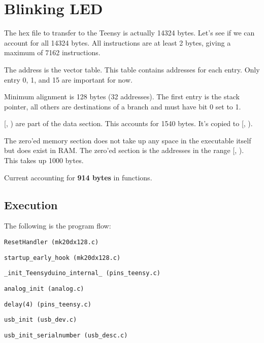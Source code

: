 \newpage
\section{Blinking LED}

The hex file to transfer to the Teensy is actually 14324 bytes.
Let's see if we can account for all 14324 bytes.
All instructions are at least 2 bytes, giving a maximum of 7162 instructions.

The address  is the vector table. This table contains
addresses for each entry. Only entry 0, 1, and 15 are important for now.

Minimum alignment is 128 bytes (32 addresses). The first entry is the stack
pointer, all others are destinations of a branch and must have bit 0 set to 1.

[, ) are part of the data
section. This accounts for 1540 bytes. It's copied to
[, ).

The zero'ed memory section does not take up any space in the executable itself
but does exist in RAM. The zero'ed section is the addresses in the range
[, ).
This takes up 1000 bytes.

Current accounting for \textbf{914 bytes} in functions.

\subsection{Execution}

The following is the program flow:

\indent \texttt{ResetHandler (mk20dx128.c)}

\hspace{2mm} \texttt{startup\_early\_hook (mk20dx128.c)}

\hspace{2mm} \texttt{\_init\_Teensyduino\_internal\_ (pins\_teensy.c)}

\hspace{4mm} \texttt{analog\_init (analog.c)}

\hspace{4mm} \texttt{delay(4) (pins\_teensy.c)}

\hspace{4mm} \texttt{usb\_init (usb\_dev.c)}

\hspace{6mm} \texttt{usb\_init\_serialnumber (usb\_desc.c)}

